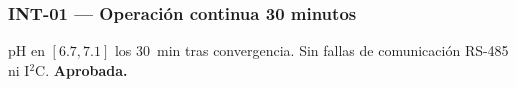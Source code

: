 \subsubsection*{INT-01 --- Operación continua 30 minutos}

\begin{table}[H]
\centering
\caption{Operación continua de 30~min con lazo cerrado activo.}
\label{tab:int01}
\renewcommand{\arraystretch}{1.3}\small
{}
\end{table}

\noindent pH en $[6.7, 7.1]$ los 30~min tras convergencia. Sin fallas de comunicación
RS-485 ni I$^2$C. \textbf{Aprobada.}
